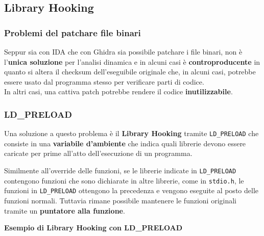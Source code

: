 \documentclass{article}
\begin{document}
\subsection{Library Hooking}
\subsubsection{Problemi del patchare file binari}
Seppur sia con IDA che con Ghidra sia possibile patchare i file binari, non è l'\textbf{unica soluzione} per l'analisi dinamica e in alcuni casi è \textbf{controproducente} in quanto si altera il checksum dell'eseguibile originale che, in alcuni casi, potrebbe essere usato dal programma stesso per verificare parti di codice.\\
In altri casi, una cattiva patch potrebbe rendere il codice \textbf{inutilizzabile}.

\subsubsection{LD\_PRELOAD}
Una soluzione a questo problema è il \textbf{Library Hooking} tramite \verb|LD_PRELOAD| che consiste in una \textbf{variabile d'ambiente} che indica quali librerie devono essere caricate per prime all'atto dell'esecuzione di un programma.

Similmente all'override delle funzioni, se le librerie indicate in \verb|LD_PRELOAD| contengono funzioni che sono dichiarate in altre librerie, come in \verb|stdio.h|, le funzioni in \verb|LD_PRELOAD| ottengono la precedenza e vengono eseguite al posto delle funzioni normali. Tuttavia rimane possibile mantenere le funzioni originali tramite un \textbf{puntatore alla funzione}.

\textbf{Esempio di Library Hooking con LD\_PRELOAD}
\end{document}
